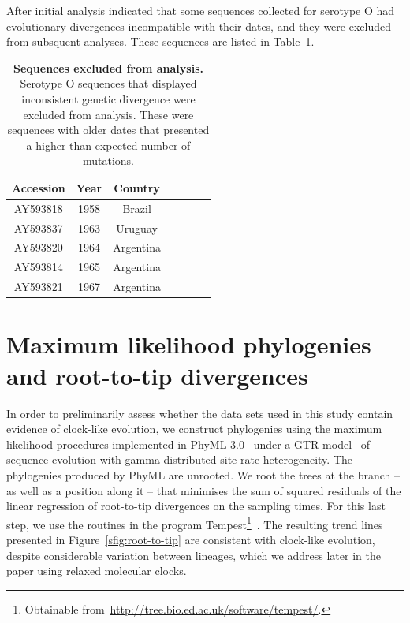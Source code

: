 \documentclass[a4paper,10pt]{article}
\begin{document}
After initial analysis indicated that some sequences collected for serotype O had evolutionary divergences incompatible with their dates, and they were excluded from subsquent analyses.
These sequences are listed in Table~\ref{stab:exclseqs}.

\begin{table}[H]
\caption{\textbf{Sequences excluded from analysis.}
Serotype O sequences that displayed inconsistent genetic divergence were excluded from analysis.
These were sequences with older dates that presented a higher than expected number of mutations.
}
\begin{center}
\begin{tabular}{ccccccc}
\toprule
Accession & Year & Country \\      
\midrule
AY593818 & 1958 & Brazil \\
AY593837 & 1963 & Uruguay \\ 
AY593820 & 1964 & Argentina  \\
AY593814 & 1965 & Argentina \\
AY593821 & 1967 & Argentina \\
\bottomrule
\end{tabular}
\end{center}
\begin{flushleft}
\end{flushleft}
\label{stab:exclseqs}
 \end{table}

\section*{Maximum likelihood phylogenies and root-to-tip divergences}

In order to preliminarily assess whether the data sets used in this study contain evidence of clock-like evolution, we construct phylogenies using the maximum likelihood procedures implemented in PhyML 3.0~\cite{M-Guindon2003} under a GTR model~\cite{M-Tavare1986} of sequence evolution with gamma-distributed site rate heterogeneity.
The phylogenies produced by PhyML are unrooted.
We root the trees at the branch -- as well as a position along it -- that minimises the sum of squared residuals of the linear regression of root-to-tip divergences on the sampling times.
For this last step, we use the routines in the program Tempest\footnote{Obtainable from~\url{http://tree.bio.ed.ac.uk/software/tempest/}.}~\citep{M-Rambaut2016}.
The resulting trend lines presented in Figure~\ref{sfig:root-to-tip} are consistent with clock-like evolution, despite considerable variation between lineages, which we address later in the paper using relaxed molecular clocks.
\end{document}
